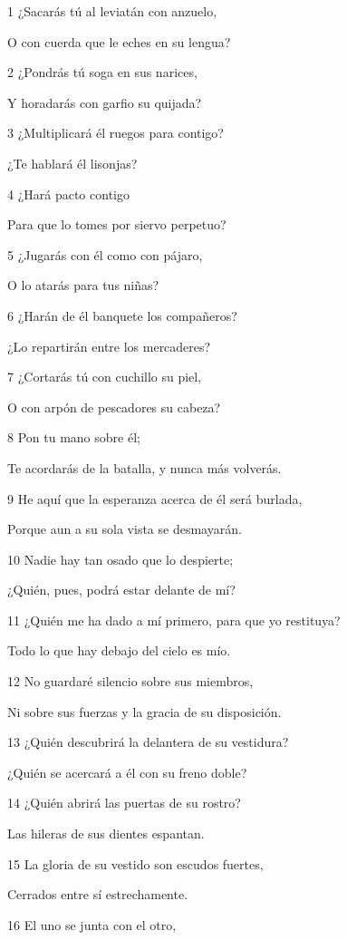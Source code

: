\par 1 ¿Sacarás tú al leviatán con anzuelo,
\par O con cuerda que le eches en su lengua?
\par 2 ¿Pondrás tú soga en sus narices,
\par Y horadarás con garfio su quijada?
\par 3 ¿Multiplicará él ruegos para contigo?
\par ¿Te hablará él lisonjas?
\par 4 ¿Hará pacto contigo
\par Para que lo tomes por siervo perpetuo?
\par 5 ¿Jugarás con él como con pájaro,
\par O lo atarás para tus niñas?
\par 6 ¿Harán de él banquete los compañeros?
\par ¿Lo repartirán entre los mercaderes?
\par 7 ¿Cortarás tú con cuchillo su piel,
\par O con arpón de pescadores su cabeza?
\par 8 Pon tu mano sobre él;
\par Te acordarás de la batalla, y nunca más volverás.
\par 9 He aquí que la esperanza acerca de él será burlada,
\par Porque aun a su sola vista se desmayarán.
\par 10 Nadie hay tan osado que lo despierte;
\par ¿Quién, pues, podrá estar delante de mí?
\par 11 ¿Quién me ha dado a mí primero, para que yo restituya? 
\par Todo lo que hay debajo del cielo es mío.
\par 12 No guardaré silencio sobre sus miembros,
\par Ni sobre sus fuerzas y la gracia de su disposición.
\par 13 ¿Quién descubrirá la delantera de su vestidura?
\par ¿Quién se acercará a él con su freno doble?
\par 14 ¿Quién abrirá las puertas de su rostro?
\par Las hileras de sus dientes espantan.
\par 15 La gloria de su vestido son escudos fuertes,
\par Cerrados entre sí estrechamente. 
\par 16 El uno se junta con el otro,
